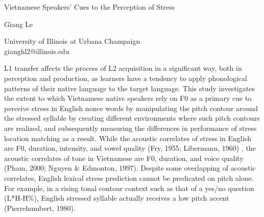 \documentclass[a4paper]{article}
\begin{document}

\Large
 \begin{center}
Vietnamese Speakers’ Cues to the Perception of Stress\\ 
\hspace{10pt}

\large
Giang Le \\

\hspace{10pt}

\small  
University of Illinois at Urbana Champaign \\
gianghl2@illinois.edu \\

\end{center}

\hspace{10pt}

\normalsize

L1 transfer affects the process of L2 acquisition in a significant way, both in perception and production, as learners have a tendency to apply phonological patterns of their native language to the target language.
This study investigates the extent to which Vietnamese native speakers rely on F0 as a primary cue to perceive stress in English nonce words by manipulating the pitch contour around the stressed syllable by creating different environments where such pitch contours are realized, and subsequently measuring the differences in performance of stress location matching as a result. While the acoustic correlates of stress in English are F0, duration, intensity, and vowel quality (Fry, 1955; Libermann, 1960) \cite{Fry:1955aa}, the acoustic correlates of tone in Vietnamese are F0, duration, and voice quality (Pham, 2000; Nguyen \& Edmonton, 1997). Despite some overlapping of acoustic correlates, English lexical stress prediction cannot be predicated on pitch alone. For example, in a rising tonal contour context such as that of a yes/no question (L*H-H\%), English stressed syllable actually receives a low pitch accent (Pierrehumbert, 1980).
\end{document}
